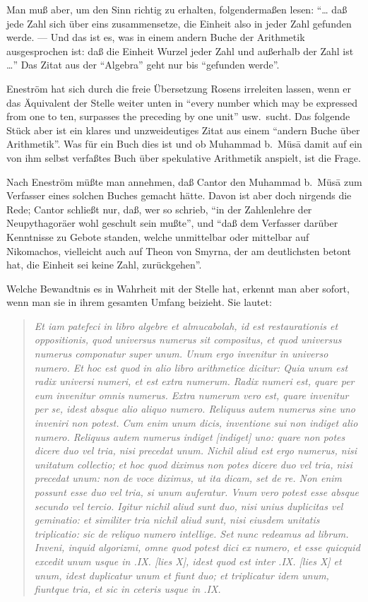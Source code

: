\documentclass[11pt,a4paper]{article}
\newcommand{\enquote}[1]{``#1''}
\begin{document}
Man mu\ss{} aber, um den Sinn richtig zu erhalten, folgenderma\ss{}en lesen: \enquote{\ldots{} da\ss{} jede Zahl sich \"uber eins zusammensetze, die Einheit also in jeder Zahl gefunden werde. --- Und das ist es, was in einem andern Buche der Arithmetik ausgesprochen ist: da\ss{} die Einheit Wurzel jeder Zahl und au\ss{}erhalb der Zahl ist \ldots{}} Das Zitat aus der \enquote{Algebra} geht nur bis \enquote{gefunden werde}.

Enestr\"om hat sich durch die freie \"Ubersetzung Rosens irreleiten lassen, wenn er das \"Aquivalent der Stelle weiter unten in \enquote{every number which may be expressed from one to ten, surpasses the preceding by one unit} usw.\ sucht. Das folgende St\"uck aber ist ein klares und unzweideutiges Zitat aus einem \enquote{andern Buche \"uber Arithmetik}. Was f\"ur ein Buch dies ist und ob Muhammad b.\ M\"us\=a damit auf ein von ihm selbst verfa\ss{}tes Buch \"uber spekulative Arithmetik anspielt, ist die Frage.

Nach Enestr\"om m\"u\ss{}te man annehmen, da\ss{} Cantor den Muhammad b.\ M\"us\=a zum Verfasser eines solchen Buches gemacht h\"atte. Davon ist aber doch nirgends die Rede; Cantor schlie\ss{}t nur, da\ss{}, wer so schrieb, \enquote{in der Zahlenlehre der Neupythagor\"aer wohl geschult sein mu\ss{}te}, und \enquote{da\ss{} dem Verfasser dar\"uber Kenntnisse zu Gebote standen, welche unmittelbar oder mittelbar auf Nikomachos, vielleicht auch auf Theon von Smyrna, der am deutlichsten betont hat, die Einheit sei keine Zahl, zur\"uckgehen}.

Welche Bewandtnis es in Wahrheit mit der Stelle hat, erkennt man aber sofort, wenn man sie in ihrem gesamten Umfang beizieht. Sie lautet:

\begin{quote}
\textit{Et iam patefeci in libro algebre et almucabolah, id est restaurationis et oppositionis, quod universus numerus sit compositus, et quod universus numerus componatur super unum. Unum ergo invenitur in universo numero. Et hoc est quod in alio libro arithmetice dicitur: Quia unum est radix universi numeri, et est extra numerum. Radix numeri est, quare per eum invenitur omnis numerus. Extra numerum vero est, quare invenitur per se, idest absque alio aliquo numero. Reliquus autem numerus sine uno inveniri non potest. Cum enim unum dicis, inventione sui non indiget alio numero. Reliquus autem numerus indiget [indiget] uno: quare non potes dicere duo vel tria, nisi precedat unum. Nichil aliud est ergo numerus, nisi unitatum collectio; et hoc quod diximus non potes dicere duo vel tria, nisi precedat unum: non de voce diximus, ut ita dicam, set de re. Non enim possunt esse duo vel tria, si unum auferatur. Vnum vero potest esse absque secundo vel tercio. Igitur nichil aliud sunt duo, nisi unius duplicitas vel geminatio: et similiter tria nichil aliud sunt, nisi eiusdem unitatis triplicatio: sic de reliquo numero intellige. Set nunc redeamus ad librum. Inveni, inquid algorizmi, omne quod potest dici ex numero, et esse quicquid excedit unum usque in .IX. [lies X], idest quod est inter .IX. [lies X] et unum, idest duplicatur unum et fiunt duo; et triplicatur idem unum, fiuntque tria, et sic in ceteris usque in .IX.}
\end{quote}
\end{document}
